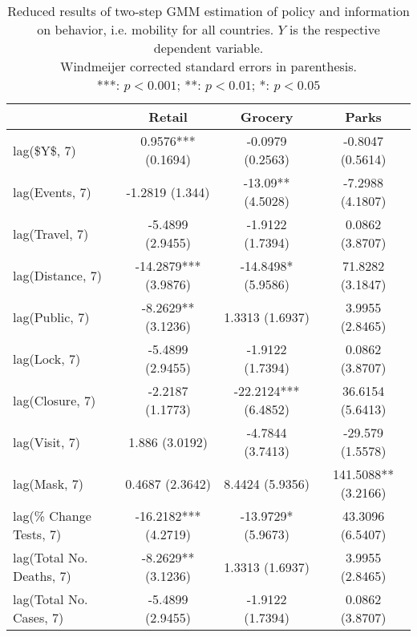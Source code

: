 \begin{table}[ht]
\centering
\begingroup\small
\begin{tabular}{lccc}
  \toprule
 & Retail & Grocery & Parks \\ 
  \midrule
lag(\$Y\$, 7) & 0.9576*** (0.1694) & -0.0979 (0.2563) & -0.8047 (0.5614) \\ 
  lag(Events, 7) & -1.2819 (1.344) & -13.09** (4.5028) & -7.2988 (4.1807) \\ 
  lag(Travel, 7) & -5.4899 (2.9455) & -1.9122 (1.7394) & 0.0862 (3.8707) \\ 
  lag(Distance, 7) & -14.2879*** (3.9876) & -14.8498* (5.9586) & 71.8282 (3.1847) \\ 
  lag(Public, 7) & -8.2629** (3.1236) & 1.3313 (1.6937) & 3.9955 (2.8465) \\ 
  lag(Lock, 7) & -5.4899 (2.9455) & -1.9122 (1.7394) & 0.0862 (3.8707) \\ 
  lag(Closure, 7) & -2.2187 (1.1773) & -22.2124*** (6.4852) & 36.6154 (5.6413) \\ 
  lag(Visit, 7) & 1.886 (3.0192) & -4.7844 (3.7413) & -29.579 (1.5578) \\ 
  lag(Mask, 7) & 0.4687 (2.3642) & 8.4424 (5.9356) & 141.5088** (3.2166) \\ 
  lag(\% Change Tests, 7) & -16.2182*** (4.2719) & -13.9729* (5.9673) & 43.3096 (6.5407) \\ 
  lag(Total No. Deaths, 7) & -8.2629** (3.1236) & 1.3313 (1.6937) & 3.9955 (2.8465) \\ 
  lag(Total No. Cases, 7) & -5.4899 (2.9455) & -1.9122 (1.7394) & 0.0862 (3.8707) \\ 
   \bottomrule
\end{tabular}
\endgroup
\caption{Reduced results of two-step GMM estimation of policy and information on behavior, i.e. mobility for all countries. $Y$ is the respective dependent variable.  \\ Windmeijer corrected standard errors in parenthesis. \\ ***: $p<0.001$; **: $p< 0.01$; *: $p< 0.05$} 
\label{tab_results:behavior_reduced_1}
\end{table}
